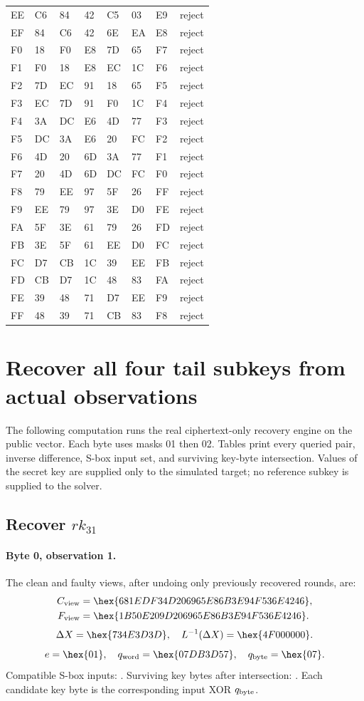\begin{longtable}{llllllll}
EE & C6 & 84 & 42 & C5 & 03 & E9 & reject\\
EF & 84 & C6 & 42 & 6E & EA & E8 & reject\\
F0 & 18 & F0 & E8 & 7D & 65 & F7 & reject\\
F1 & F0 & 18 & E8 & EC & 1C & F6 & reject\\
F2 & 7D & EC & 91 & 18 & 65 & F5 & reject\\
F3 & EC & 7D & 91 & F0 & 1C & F4 & reject\\
F4 & 3A & DC & E6 & 4D & 77 & F3 & reject\\
F5 & DC & 3A & E6 & 20 & FC & F2 & reject\\
F6 & 4D & 20 & 6D & 3A & 77 & F1 & reject\\
F7 & 20 & 4D & 6D & DC & FC & F0 & reject\\
F8 & 79 & EE & 97 & 5F & 26 & FF & reject\\
F9 & EE & 79 & 97 & 3E & D0 & FE & reject\\
FA & 5F & 3E & 61 & 79 & 26 & FD & reject\\
FB & 3E & 5F & 61 & EE & D0 & FC & reject\\
FC & D7 & CB & 1C & 39 & EE & FB & reject\\
FD & CB & D7 & 1C & 48 & 83 & FA & reject\\
FE & 39 & 48 & 71 & D7 & EE & F9 & reject\\
FF & 48 & 39 & 71 & CB & 83 & F8 & reject\\
\bottomrule\end{longtable}
\endgroup
\section{Recover all four tail subkeys from actual observations}
The following computation runs the real ciphertext-only recovery engine on the public vector. Each byte uses masks 01 then 02. Tables print every queried pair, inverse difference, S-box input set, and surviving key-byte intersection. Values of the secret key are supplied only to the simulated target; no reference subkey is supplied to the solver.
\subsection*{Recover $rk_{31}$}
\paragraph{Byte 0, observation 1.}
The clean and faulty views, after undoing only previously recovered rounds, are:
\[\begin{aligned}C_{\rm view}&=\hex{681EDF34D206965E86B3E94F536E4246},\\F_{\rm view}&=\hex{1B50E209D206965E86B3E94F536E4246}.\end{aligned}\]
\[\Delta X=\hex{734E3D3D},\quad L^{-1}(\Delta X)=\hex{4F000000}.\]
\[e=\hex{01},\quad q_{\rm word}=\hex{07DB3D57},\quad q_{\rm byte}=\hex{07}.\]
Compatible S-box inputs: . Surviving key bytes after intersection: . Each candidate key byte is the corresponding input XOR $q_{\rm byte}$.
